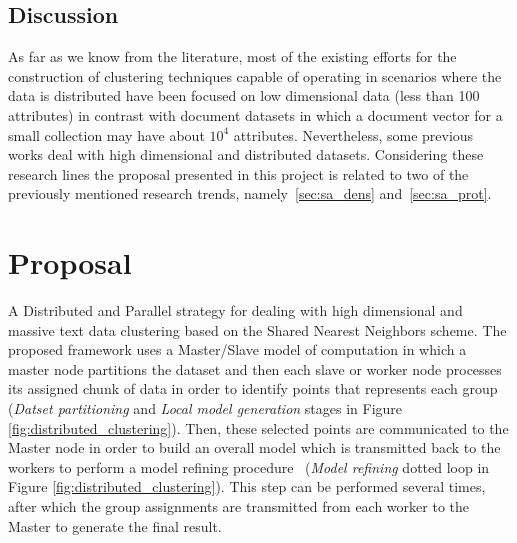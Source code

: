 \documentclass[10pt]{article}
\begin{document}
\subsection{Discussion}
As far as we know from the literature, most of the existing efforts for the construction of clustering techniques capable of operating in scenarios where the data is distributed have been focused on low dimensional data (less than 100 attributes) in contrast with document datasets in which a document vector for a small collection may have about $10^4$ attributes. 
Nevertheless, some previous works deal with high dimensional and distributed datasets.
Considering these research lines the proposal presented in this project is related to two of the previously mentioned research trends, namely~\ref{sec:sa_dens} and~\ref{sec:sa_prot}.


\section{Proposal}
A Distributed and Parallel strategy for dealing with high dimensional and massive text data clustering based on the Shared Nearest Neighbors scheme. The proposed framework uses a Master/Slave model of computation in which a master node partitions the dataset and then each slave or worker node processes its assigned chunk of data in order to identify points that represents each group (\textit{Datset partitioning} and \textit{Local model generation} stages in Figure
\ref{fig:distributed_clustering}). Then, these selected points are communicated to the Master node in order to build an overall model which is transmitted back to the workers to perform a model refining procedure~ (\textit{Model refining} dotted loop in Figure \ref{fig:distributed_clustering}). This step can be performed several times, after which the group assignments are transmitted from each worker to the Master to generate the final result.
\end{document}
